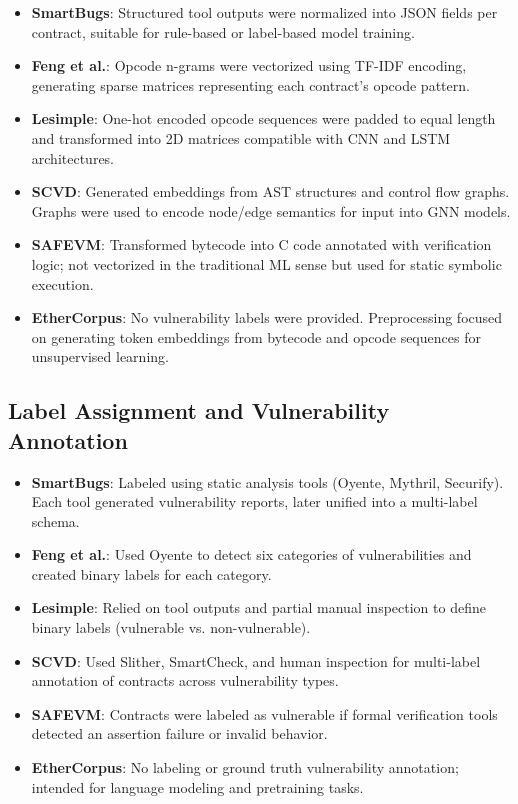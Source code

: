 \begin{itemize}
    \item \textbf{SmartBugs}: Structured tool outputs were normalized into JSON fields per contract, suitable for rule-based or label-based model training.
    \item \textbf{Feng et al.}: Opcode n-grams were vectorized using TF-IDF encoding, generating sparse matrices representing each contract’s opcode pattern.
    \item \textbf{Lesimple}: One-hot encoded opcode sequences were padded to equal length and transformed into 2D matrices compatible with CNN and LSTM architectures.
    \item \textbf{SCVD}: Generated embeddings from AST structures and control flow graphs. Graphs were used to encode node/edge semantics for input into GNN models.
    \item \textbf{SAFEVM}: Transformed bytecode into C code annotated with verification logic; not vectorized in the traditional ML sense but used for static symbolic execution.
    \item \textbf{EtherCorpus}: No vulnerability labels were provided. Preprocessing focused on generating token embeddings from bytecode and opcode sequences for unsupervised learning.
\end{itemize}

\subsection*{Label Assignment and Vulnerability Annotation}

\begin{itemize}
    \item \textbf{SmartBugs}: Labeled using static analysis tools (Oyente, Mythril, Securify). Each tool generated vulnerability reports, later unified into a multi-label schema.
    \item \textbf{Feng et al.}: Used Oyente to detect six categories of vulnerabilities and created binary labels for each category.
    \item \textbf{Lesimple}: Relied on tool outputs and partial manual inspection to define binary labels (vulnerable vs. non-vulnerable).
    \item \textbf{SCVD}: Used Slither, SmartCheck, and human inspection for multi-label annotation of contracts across vulnerability types.
    \item \textbf{SAFEVM}: Contracts were labeled as vulnerable if formal verification tools detected an assertion failure or invalid behavior.
    \item \textbf{EtherCorpus}: No labeling or ground truth vulnerability annotation; intended for language modeling and pretraining tasks.
\end{itemize}


